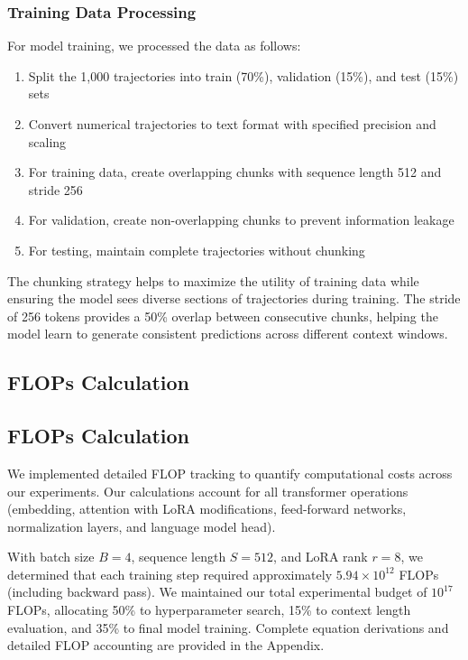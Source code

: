 \documentclass{article}
\begin{document}
\subsubsection*{Training Data Processing}

For model training, we processed the data as follows:
\begin{enumerate}
    \item Split the 1,000 trajectories into train (70\%), validation (15\%), and test (15\%) sets
    \item Convert numerical trajectories to text format with specified precision and scaling
    \item For training data, create overlapping chunks with sequence length 512 and stride 256
    \item For validation, create non-overlapping chunks to prevent information leakage
    \item For testing, maintain complete trajectories without chunking
\end{enumerate}

The chunking strategy helps to maximize the utility of training data while ensuring the model sees diverse sections of trajectories during training. The stride of 256 tokens provides a 50\% overlap between consecutive chunks, helping the model learn to generate consistent predictions across different context windows.

\subsection*{FLOPs Calculation}
\subsection*{FLOPs Calculation}

We implemented detailed FLOP tracking to quantify computational costs across our experiments. Our calculations account for all transformer operations (embedding, attention with LoRA modifications, feed-forward networks, normalization layers, and language model head). 

With batch size $B=4$, sequence length $S=512$, and LoRA rank $r=8$, we determined that each training step required approximately $5.94 \times 10^{12}$ FLOPs (including backward pass). We maintained our total experimental budget of $10^{17}$ FLOPs, allocating 50\% to hyperparameter search, 15\% to context length evaluation, and 35\% to final model training. Complete equation derivations and detailed FLOP accounting are provided in the Appendix.
\end{document}
